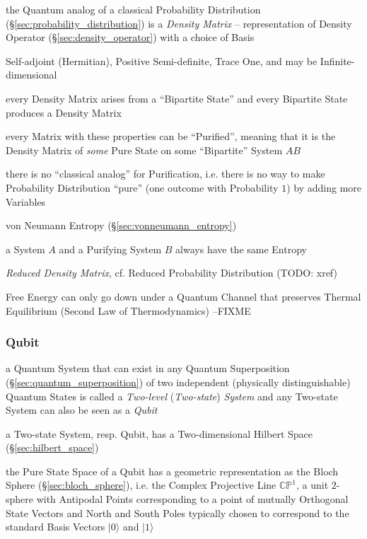the Quantum analog of a classical Probability Distribution
(\S\ref{sec:probability_distribution}) is a \emph{Density Matrix} --
representation of Density Operator (\S\ref{sec:density_operator}) with a choice
of Basis

Self-adjoint (Hermitian), Positive Semi-definite, Trace One, and may be
Infinite-dimensional

every Density Matrix arises from a ``Bipartite State'' and every Bipartite State
produces a Density Matrix

every Matrix with these properties can be ``Purified'', meaning that it is the
Density Matrix of \emph{some} Pure State on some ``Bipartite'' System $AB$

there is no ``classical analog'' for Purification, i.e. there is no way to make
Probability Distribution ``pure'' (one outcome with Probability $1$) by adding
more Variables

von Neumann Entropy (\S\ref{sec:vonneumann_entropy})

a System $A$ and a Purifying System $B$ always have the same Entropy

\emph{Reduced Density Matrix}, cf. Reduced Probability Distribution (TODO: xref)

Free Energy can only go down under a Quantum Channel that preserves Thermal
Equilibrium (Second Law of Thermodynamics)
--FIXME



\subsubsection{Qubit}\label{sec:qubit}

a Quantum System that can exist in any Quantum Superposition
(\S\ref{sec:quantum_superposition}) of two independent (physically
distinguishable) Quantum States is called a \emph{Two-level} (\emph{Two-state})
\emph{System} and any Two-state System can also be seen as a \emph{Qubit}

a Two-state System, resp. Qubit, has a Two-dimensional Hilbert Space
(\S\ref{sec:hilbert_space})

the Pure State Space of a Qubit has a geometric representation as the Bloch
Sphere (\S\ref{sec:bloch_sphere}), i.e. the Complex Projective Line
$\mathbb{CP}^1$, a unit $2$-sphere with Antipodal Points corresponding to a
point of mutually Orthogonal State Vectors and North and South Poles typically
chosen to correspond to the standard Basis Vectors $|0\rangle$ and $|1\rangle$

